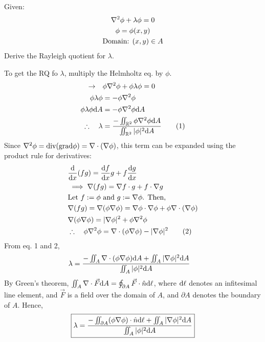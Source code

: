 \begin{example}
Given: \begin{gather*}
  \laplacian \phi + \lambda \phi = 0 \\
  \phi = \phi(x, y) \\
  \text{Domain: }(x, y) \in A
\end{gather*}
Derive the Rayleigh quotient for $\lambda$. 

To get the RQ fo $\lambda$, multiply the Helmholtz eq. by $\phi$. 
\begin{align*}
  \to \quad
    & \phi\nabla^2\phi + \phi \lambda \phi = 0 \\
  \phi\lambda \phi &= -\phi\nabla^2\phi \\
  \phi\lambda \phi \text{d} A &= -\phi\nabla^2\phi \text{d} A \\
  \therefore\quad \lambda 
    &= \frac{-\iint_{\mathbb{R}^2} \phi\nabla^2\phi \text{d} A}
      {\iint_{\mathbb{R}^2} |\phi|^2 \text{d} A } \tag{1}
\end{align*}
Since $\laplacian\phi = \text{div(grad}\phi) = \nabla\cdot (\nabla\phi)$, this term can be expanded using the product rule for derivatives:
\begin{align*}
  &\frac{\d }{\d x} (fg) = \frac{\d f}{\d x} g + f\frac{\d g}{\d x} \\
  &\implies \nabla(fg) = \nabla f \cdot g + f \cdot \nabla g \\
  &\text{Let $f:= \phi$ and $g:= \nabla \phi$. Then, }\\
  &\nabla(fg) = \nabla(\phi\nabla\phi) 
    = \nabla\phi\cdot \nabla\phi + \phi\nabla\cdot (\nabla \phi) \\
  &\nabla(\phi\nabla\phi) = |\nabla \phi|^2 + \phi\laplacian\phi \\
  &\therefore\quad \phi\laplacian\phi 
    = \nabla\cdot (\phi\nabla\phi) - |\nabla\phi |^2 \tag{2}
\end{align*} 
From eq. 1 and 2, 
\begin{align*}
\lambda 
  &= \frac{-\iint_{A} \nabla \cdot(\phi\nabla\phi)\text{d} A
    + \iint_{A} |\nabla \phi|^2 \text{d} A}
  {\iint_{A} |\phi|^2 \text{d} A } 
\end{align*}
By Green's theorem, $\iint_A \nabla \cdot \vec{F} \text{d} A 
= \oint_{\partial A} \vec{F} \cdot \hat{n} \text{d} \ell $, 
where $\text{d} \ell$ denotes an infitesimal line element, and $\vec{F}$ is a field over the domain of $A$, and $\partial A$ denotes the boundary of $A$. Hence, 
\[ \boxed{ 
  \lambda 
  = \frac{-\iint_{\partial A} (\phi\nabla\phi)\cdot \hat{n} \text{d} \ell 
    + \iint_{A} |\nabla \phi|^2 \text{d} A}
  {\iint_{A} |\phi|^2 \text{d} A }
} \]
\end{example}

